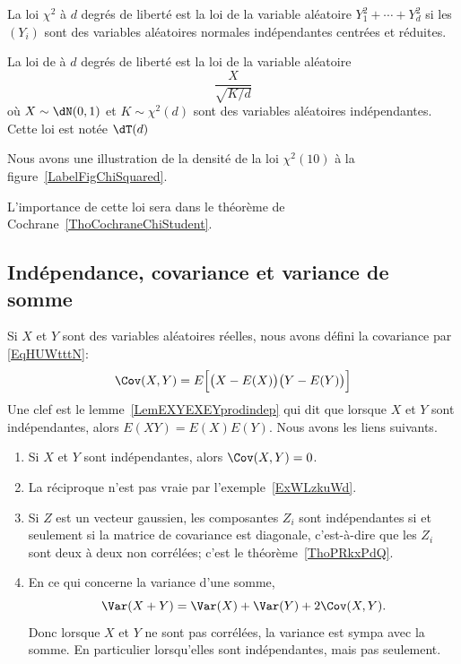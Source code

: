 \begin{definition}		\label{DEFooKWKNooWbGAmf}
	La loi \( \chi^2\) à \( d\) degrés de liberté est la loi de la variable aléatoire \( Y_1^2+\cdots+Y_d^2\) si les \( (Y_i)\) sont des variables aléatoires normales indépendantes centrées et réduites.

	La loi de  à \( d\) degrés de liberté est la loi de la variable aléatoire
	\begin{equation}
		\frac{ X }{ \sqrt{K/d} }
	\end{equation}
	où \( X\sim\dN(0,1)\) et \( K\sim\chi^2(d)\) sont des variables aléatoires indépendantes. Cette loi est notée \( \dT(d)\)
\end{definition}

Nous avons une illustration de la densité de la loi \( \chi^2(10)\) à la figure~\ref{LabelFigChiSquared}.
\newcommand{\CaptionFigChiSquared}{La densité de \( \chi^2(10)\).}


L'importance de cette loi sera dans le théorème de Cochrane~\ref{ThoCochraneChiStudent}.

\subsection{Indépendance, covariance et variance de somme}
\label{subsecTTHohur}

Si \( X\) et \( Y\) sont des variables aléatoires réelles, nous avons défini la covariance par \eqref{EqHUWtttN}:
\begin{equation}
	\Cov(X,Y)=E\Big[ \big( X-E(X) \big)\big( Y-E(Y) \big) \Big]
\end{equation}
Une clef est le lemme~\ref{LemEXYEXEYprodindep} qui dit que lorsque \( X\) et \( Y\) sont indépendantes, alors \( E(XY)=E(X)E(Y)\). Nous avons les liens suivants.
\begin{enumerate}
	\item
	      Si \( X\) et \( Y\) sont indépendantes, alors \( \Cov(X,Y)=0\).
	\item
	      La réciproque n'est pas vraie par l'exemple~\ref{ExWLzkuWd}.
	\item
	      Si \( Z\) est un vecteur gaussien, les composantes \( Z_i\) sont indépendantes si et seulement si la matrice de covariance est diagonale, c'est-à-dire que les \( Z_i\) sont deux à deux non corrélées; c'est le théorème~\ref{ThoPRkxPdQ}.
	\item
	      En ce qui concerne la variance d'une somme,
	      \begin{equation}
		      \Var(X+Y)=\Var(X)+\Var(Y)+2\Cov(X,Y).
	      \end{equation}
	      Donc lorsque \( X\) et \( Y\) ne sont pas corrélées, la variance est sympa avec la somme. En particulier lorsqu'elles sont indépendantes, mais pas seulement.
\end{enumerate}

